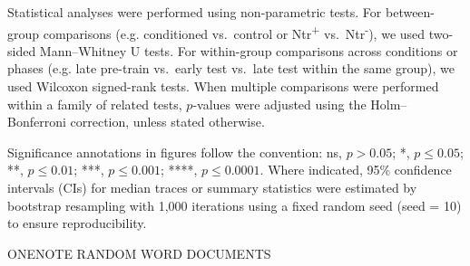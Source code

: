 Statistical analyses were performed using non-parametric tests. For between-group comparisons (e.g. conditioned vs.\ control or Ntr\textsuperscript{+} vs.\ Ntr\textsuperscript{-}), we used two-sided Mann--Whitney U tests. For within-group comparisons across conditions or phases (e.g. late pre-train vs.\ early test vs.\ late test within the same group), we used Wilcoxon signed-rank tests. When multiple comparisons were performed within a family of related tests, $p$-values were adjusted using the Holm--Bonferroni correction, unless stated otherwise.

Significance annotations in figures follow the convention: ns, $p > 0.05$; *, $p \leq 0.05$; **, $p \leq 0.01$; ***, $p \leq 0.001$; ****, $p \leq 0.0001$. Where indicated, 95\% confidence intervals (CIs) for median traces or summary statistics were estimated by bootstrap resampling with 1{,}000 iterations using a fixed random seed (seed = 10) to ensure reproducibility.










ONENOTE
RANDOM WORD DOCUMENTS

